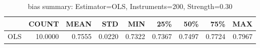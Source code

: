 \begin{table}[ht]
\centering
\caption{bias summary: Estimator=OLS, Instruments=200, Strength=0.30}
\begin{tabular}{lrrrrrrrr}
\toprule
 & COUNT & MEAN & STD & MIN & 25\% & 50\% & 75\% & MAX \\
\midrule
OLS & 10.0000 & 0.7555 & 0.0220 & 0.7322 & 0.7367 & 0.7497 & 0.7724 & 0.7967 \\
\bottomrule
\end{tabular}
\end{table}
